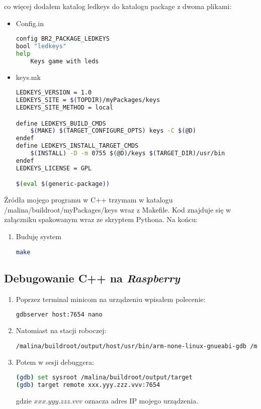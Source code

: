co więcej dodałem katalog ledkeys do katalogu package z dwoma plikami:
\begin{itemize}
	\item Config.in
	\begin{lstlisting}[language=bash]
config BR2_PACKAGE_LEDKEYS
bool "ledkeys"
help
	Keys game with leds
\end{lstlisting}
	\item keys.mk
\begin{lstlisting}[language=bash]
LEDKEYS_VERSION = 1.0
LEDKEYS_SITE = $(TOPDIR)/myPackages/keys
LEDKEYS_SITE_METHOD = local

define LEDKEYS_BUILD_CMDS
	$(MAKE) $(TARGET_CONFIGURE_OPTS) keys -C $(@D)
endef
define LEDKEYS_INSTALL_TARGET_CMDS
	$(INSTALL) -D -m 0755 $(@D)/keys $(TARGET_DIR)/usr/bin
endef
LEDKEYS_LICENSE = GPL

$(eval $(generic-package))
\end{lstlisting}
\end{itemize}
Źródła mojego programu w C++ trzymam w katalogu /malina/buildroot/myPackages/keys wraz
z Makefile. Kod znajduje się w załączniku spakowanym wraz ze skryptem Pythona.
Na końcu:
\begin{enumerate}	
	\item Buduję system
	\begin{lstlisting}[language=bash]
	make
	\end{lstlisting}		
\end{enumerate}

\subsection{Debugowanie C++ na \emph{Raspberry}}
\begin{enumerate}
\item Poprzez terminal minicom na urządzeniu wpisałem polecenie:
\begin{lstlisting}[language=bash]
gdbserver host:7654 nano
\end{lstlisting}

\item Natomiast na stacji roboczej:
\begin{lstlisting}[language=bash]
/malina/buildroot/output/host/usr/bin/arm-none-linux-gnueabi-gdb /malina/buildroot/output/build/ledkeys-1.0/keys
\end{lstlisting}

\item Potem w sesji debuggera:
\begin{lstlisting}[language=bash]
(gdb) set sysroot /malina/buildroot/output/target
(gdb) target remote xxx.yyy.zzz.vvv:7654
\end{lstlisting}
gdzie $xxx.yyy.zzz.vvv$ oznacza adres IP mojego urządzenia.
\end{enumerate}

